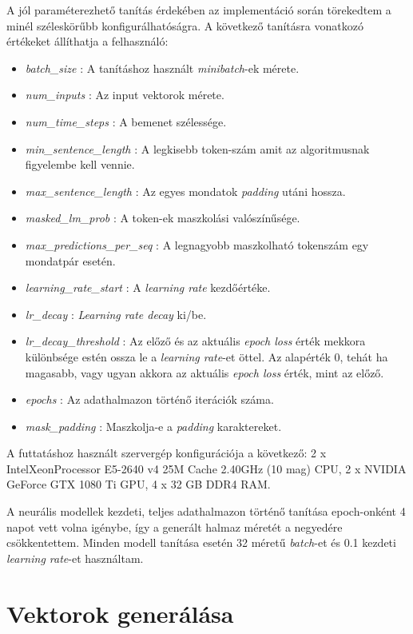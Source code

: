 A jól paraméterezhető tanítás érdekében az implementáció során törekedtem a minél széleskörűbb konfigurálhatóságra. A következő tanításra vonatkozó értékeket állíthatja a felhasználó:
\begin{itemize}
	\item \textit{batch\_size} : A tanításhoz használt \textit{minibatch}-ek mérete.
	\item \textit{num\_inputs} : Az input vektorok mérete.
	\item \textit{num\_time\_steps} : A bemenet szélessége.
	\item \textit{min\_sentence\_length} : A legkisebb token-szám amit az algoritmusnak figyelembe kell vennie.
	\item \textit{max\_sentence\_length} : Az egyes mondatok \textit{padding} utáni hossza.
	\item \textit{masked\_lm\_prob} : A token-ek maszkolási valószínűsége.
	\item \textit{max\_predictions\_per\_seq} : A legnagyobb maszkolható tokenszám egy mondatpár esetén.
	
	\item \textit{learning\_rate\_start} : A \textit{learning rate} kezdőértéke.
	\item \textit{lr\_decay} : \textit{Learning rate decay} ki/be.
	\item \textit{lr\_decay\_threshold} : Az előző és az aktuális \textit{epoch loss} érték mekkora különbsége estén ossza le a \textit{learning rate}-et öttel. Az alapérték 0, tehát ha magasabb, vagy ugyan akkora az aktuális \textit{epoch loss} érték, mint az előző.
	\item \textit{epochs} : Az adathalmazon történő iterációk száma.
	\item \textit{mask\_padding} : Maszkolja-e a \textit{padding} karaktereket.
\end{itemize}

A futtatáshoz használt szervergép konfigurációja a következő: 2 x Intel\textregistered Xeon\textregistered  Processor E5-2640 v4 25M Cache 2.40GHz (10 mag) CPU, 2 x NVIDIA GeForce GTX 1080 Ti GPU, 4 x 32 GB DDR4 RAM.

A neurális modellek kezdeti, teljes adathalmazon történő tanítása epoch-onként 4 napot vett volna igénybe, így a generált halmaz méretét a negyedére csökkentettem. Minden modell tanítása esetén 32 méretű \textit{batch}-et és 0.1 kezdeti \textit{learning rate}-et használtam. 


\section{Vektorok generálása}

